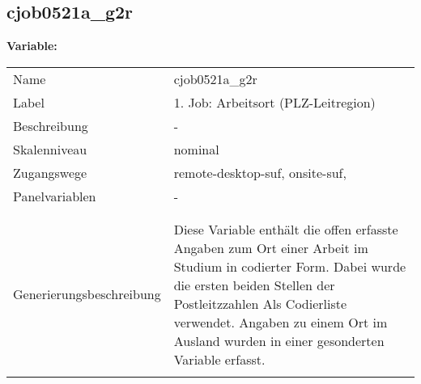 	
	
	\subsection{cjob0521a\_g2r}
	\label{subSection:cjob0521a_g2r}

	\noindent\textbf{Variable:}\\
		\begin{tabular}{lL{11.3cm}}
			\label{tableVariable:cjob0521a_g2r}
			Name & cjob0521a\_g2r \\
			Label & 1. Job: Arbeitsort (PLZ-Leitregion) \\
			Beschreibung & - \\
			Skalenniveau & nominal \\
			Zugangswege &
				remote-desktop-suf,
				onsite-suf,
 \\
			Panelvariablen & -
			 \\
			 \\
 \\
					Generierungsbeschreibung & Diese Variable enthält die offen erfasste Angaben zum Ort einer Arbeit im Studium in codierter Form. Dabei wurde die ersten beiden Stellen der Postleitzzahlen Als Codierliste verwendet. Angaben zu einem Ort im Ausland wurden in einer gesonderten Variable erfasst.
				 \\	
			 \\
		\end{tabular}






